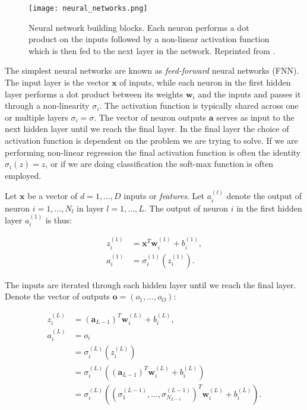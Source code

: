 \begin{figure}[H]
    \centering
    \texttt{[image: neural\_networks.png]}
    \caption{Neural network building blocks. 
    Each neuron performs a dot product on the inputs followed
    by a non-linear activation function which is then fed to the
    next layer in the network. Reprinted from
    \parencite[Vieira, Pinaya, Mechelli]{vieira2017using}.}
    \label{fig:neural-networks}
\end{figure}

The simplest neural networks are known as \textit{feed-forward} 
neural networks (FNN).
The input layer is the vector $\bm{x}$ of inputs, while each neuron in the first
hidden layer performs a dot product between its weights $\bm{w}_i$ and the inputs
and passes it through a non-linearity $\sigma_i$. The activation function
is typically shared across one or multiple layers $\sigma_i = \sigma$.
The vector of neuron outputs $\bm{a}$ serves as input to the 
next hidden layer until we reach the final layer.
In the final layer the choice of activation function is dependent on the problem
we are trying to solve. If we are performing non-linear regression the
final activation function is often the identity $\sigma_i(z) = z$, or if
we are doing classification the soft-max function is often employed.

Let $\bm{x}$ be a vector of $d = 1,\dots,D$ inputs or 
\textit{features}. Let $a_i^{(l)}$
denote the output of neuron $i = 1,\dots,N_l$ in layer $l = 1,\dots,L$.
The output of neuron $i$ in the first hidden layer $a_i^{(1)}$ is thus:

\begin{equation}
\begin{split}
    z_i^{(1)} &= \bm{x}^T \bm{w}_i^{(1)} + b_i^{(1)} , \\
    a_i^{(1)} &= \sigma_i^{(1)}(z_i^{(1)}) . 
\end{split}
\end{equation}

The inputs are iterated through each hidden layer until we reach the final layer.
Denote the vector of outputs $\bm{o} = \left(o_1,\dots,o_O\right)$:

\begin{equation}
\begin{split}
    z_i^{(L)} &= (\bm{a}_{L-1})^T \bm{w}_i^{(L)} + b_i^{(L)} , \\
    a_i^{(L)} &= o_i \\
              &= \sigma_i^{(L)}(z_i^{(L)}) \\
    &= \sigma_i^{(L)} \left((\bm{a}_{L-1})^T \bm{w}_i^{(L)} + b_i^{(L)} \right) \\
    &= \sigma_i^{(L)} \left(
    \left( \sigma_1^{(L-1)},\dots,\sigma_{N_{L-1}}^{(L-1)} \right)^T
    \bm{w}_i^{(L)} + b_i^{(L)} \right) .
\end{split}
\end{equation}


